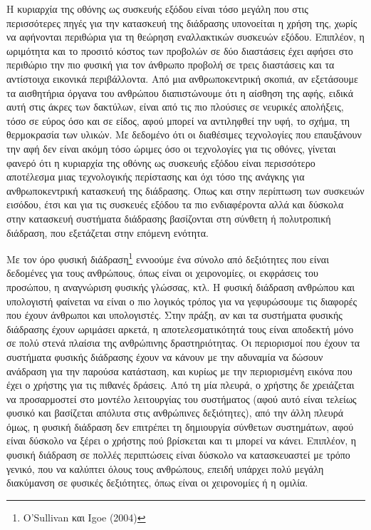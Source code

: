 \documentclass[
]{article}
\begin{document}
Η κυριαρχία της οθόνης ως συσκευής εξόδου είναι τόσο μεγάλη που στις
περισσότερες πηγές για την κατασκευή της διάδρασης υπονοείται η χρήση
της, χωρίς να αφήνονται περιθώρια για τη θεώρηση εναλλακτικών συσκευών
εξόδου. Επιπλέον, η ωριμότητα και το προσιτό κόστος των προβολών σε δύο
διαστάσεις έχει αφήσει στο περιθώριο την πιο φυσική για τον άνθρωπο
προβολή σε τρεις διαστάσεις και τα αντίστοιχα εικονικά περιβάλλοντα. Από
μια ανθρωποκεντρική σκοπιά, αν εξετάσουμε τα αισθητήρια όργανα του
ανθρώπου διαπιστώνουμε ότι η αίσθηση της αφής, ειδικά αυτή στις άκρες
των δακτύλων, είναι από τις πιο πλούσιες σε νευρικές απολήξεις, τόσο σε
εύρος όσο και σε είδος, αφού μπορεί να αντιληφθεί την υφή, το σχήμα, τη
θερμοκρασία των υλικών. Με δεδομένο ότι οι διαθέσιμες τεχνολογίες που
επαυξάνουν την αφή δεν είναι ακόμη τόσο ώριμες όσο οι τεχνολογίες για
τις οθόνες, γίνεται φανερό ότι η κυριαρχία της οθόνης ως συσκευής εξόδου
είναι περισσότερο αποτέλεσμα μιας τεχνολογικής περίστασης και όχι τόσο
της ανάγκης για ανθρωποκεντρική κατασκευή της διάδρασης. Όπως και στην
περίπτωση των συσκευών εισόδου, έτσι και για τις συσκευές εξόδου τα πιο
ενδιαφέροντα αλλά και δύσκολα στην κατασκευή συστήματα διάδρασης
βασίζονται στη σύνθετη ή πολυτροπική διάδραση, που εξετάζεται στην
επόμενη ενότητα.

Με τον όρο φυσική διάδραση\footnote{O'Sullivan και Igoe (2004)} εννοούμε
ένα σύνολο από δεξιότητες που είναι δεδομένες για τους ανθρώπους, όπως
είναι οι χειρονομίες, οι εκφράσεις του προσώπου, η αναγνώριση φυσικής
γλώσσας, κτλ. Η φυσική διάδραση ανθρώπου και υπολογιστή φαίνεται να
είναι ο πιο λογικός τρόπος για να γεφυρώσουμε τις διαφορές που έχουν
άνθρωποι και υπολογιστές. Στην πράξη, αν και τα συστήματα φυσικής
διάδρασης έχουν ωριμάσει αρκετά, η αποτελεσματικότητά τους είναι
αποδεκτή μόνο σε πολύ στενά πλαίσια της ανθρώπινης δραστηριότητας. Οι
περιορισμοί που έχουν τα συστήματα φυσικής διάδρασης έχουν να κάνουν με
την αδυναμία να δώσουν ανάδραση για την παρούσα κατάσταση, και κυρίως με
την περιορισμένη εικόνα που έχει ο χρήστης για τις πιθανές δράσεις. Από
τη μία πλευρά, ο χρήστης δε χρειάζεται να προσαρμοστεί στο μοντέλο
λειτουργίας του συστήματος (αφού αυτό είναι τελείως φυσικό και βασίζεται
απόλυτα στις ανθρώπινες δεξιότητες), από την άλλη πλευρά όμως, η φυσική
διάδραση δεν επιτρέπει τη δημιουργία σύνθετων συστημάτων, αφού είναι
δύσκολο να ξέρει ο χρήστης πού βρίσκεται και τι μπορεί να κάνει.
Επιπλέον, η φυσική διάδραση σε πολλές περιπτώσεις είναι δύσκολο να
κατασκευαστεί με τρόπο γενικό, που να καλύπτει όλους τους ανθρώπους,
επειδή υπάρχει πολύ μεγάλη διακύμανση σε φυσικές δεξιότητες, όπως είναι
οι χειρονομίες ή η ομιλία.
\end{document}
